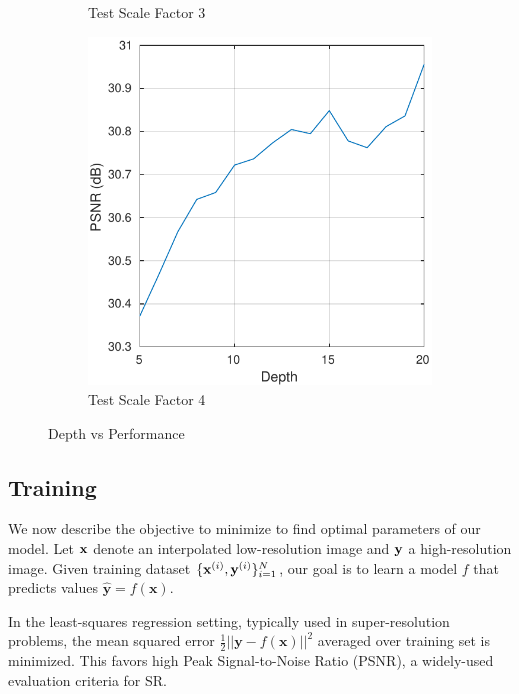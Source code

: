 \documentclass[10pt,twocolumn,letterpaper]{article}
\begin{document}
\begin{figure}[t]
\begin{subfigure}{0.25\textwidth}
		\caption{Test Scale Factor 3}
		\label{fig:tiger}
	\end{subfigure}
	\quad
	\begin{subfigure}{0.25\textwidth}
		\includegraphics[width=\textwidth]{figs/depth_exp3}
		\caption{Test Scale Factor 4}
		\label{fig:mouse}
	\end{subfigure}
	\caption{Depth vs Performance}\label{fig:depth}
\end{figure}


\subsection{Training}

We now describe the objective to minimize to find optimal parameters of our model. Let ${\bf x}$ denote an interpolated low-resolution image and ${\bf y}$ a high-resolution image. 
Given training dataset $\{{\bf x}^{(i)},{\bf y}^{(i)}\}{}_{i=1}^{N}$, our goal is to learn a model $f$ that predicts values $\mathbf{\hat{y}}=f(\mathbf{x})$.

In the least-squares regression setting, typically used in super-resolution
problems, the mean squared error $\frac{1}{2}||\mathbf{y}-f(\mathbf{x})||^{2}$
averaged over training set is minimized. This favors high Peak Signal-to-Noise
Ratio (PSNR), a widely-used evaluation criteria for SR. 
\end{document}
